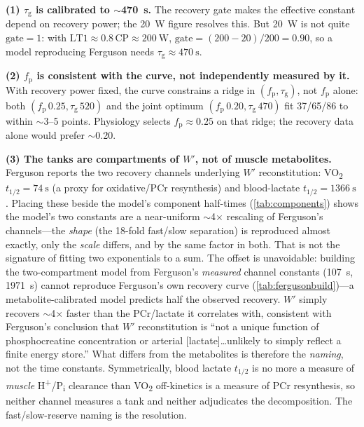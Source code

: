 \documentclass[11pt,a4paper]{article}
\newcommand{\Wp}{\ensuremath{W'}}
\newcommand{\CP}{\ensuremath{\mathrm{CP}}}
\newcommand{\LTone}{\ensuremath{\mathrm{LT1}}}
\newcommand{\fp}{\ensuremath{f_{\mathrm p}}}
\newcommand{\taug}{\ensuremath{\tau_{\mathrm g}}}
\newcommand{\halft}{\ensuremath{t_{1/2}}}
\begin{document}
\textbf{(1) \taug{} is calibrated to $\sim$470~s.} The recovery gate makes the effective constant depend on
recovery power; the 20~W figure resolves this. But 20~W is not quite $\mathrm{gate}=1$: with
$\LTone \approx 0.8\,\CP \approx 200~\mathrm{W}$, $\mathrm{gate} = (200-20)/200 = 0.90$, so a model
reproducing Ferguson needs $\taug \approx 470~\mathrm{s}$.

\textbf{(2) \fp{} is consistent with the curve, not independently measured by it.} With recovery power
fixed, the curve constrains a ridge in $(\fp,\taug)$, not \fp{} alone: both $(\fp\,0.25, \taug\,520)$ and
the joint optimum $(\fp\,0.20, \taug\,470)$ fit 37/65/86 to within $\sim$3--5 points. Physiology selects
$\fp \approx 0.25$ on that ridge; the recovery data alone would prefer $\sim$0.20.

\textbf{(3) The tanks are compartments of \Wp, not of muscle metabolites.} Ferguson reports the two
recovery channels underlying \Wp{} reconstitution: VO\textsubscript{2} $\halft = \SI{74}{\second}$ (a proxy
for oxidative/PCr resynthesis) and blood-lactate $\halft = \SI{1366}{\second}$. Placing these beside the
model's component half-times (\cref{tab:components}) shows the model's two constants are a near-uniform
$\sim$4$\times$ rescaling of Ferguson's channels---the \emph{shape} (the 18-fold fast/slow separation) is
reproduced almost exactly, only the \emph{scale} differs, and by the same factor in both. That is not the
signature of fitting two exponentials to a sum. The offset is unavoidable: building the two-compartment
model from Ferguson's \emph{measured} channel constants (107~s, 1971~s) cannot reproduce Ferguson's own
recovery curve (\cref{tab:fergusonbuild})---a metabolite-calibrated model predicts half the observed
recovery. \Wp{} simply recovers $\sim$4$\times$ faster than the PCr/lactate it correlates with, consistent
with Ferguson's conclusion that \Wp{} reconstitution is ``not a unique function of phosphocreatine
concentration or arterial [lactate]\dots unlikely to simply reflect a finite energy store.'' What differs
from the metabolites is therefore the \emph{naming}, not the time constants. Symmetrically, blood lactate
\halft{} is no more a measure of \emph{muscle} H\textsuperscript{+}/P\textsubscript{i} clearance than
VO\textsubscript{2} off-kinetics is a measure of PCr resynthesis, so neither channel measures a tank and
neither adjudicates the decomposition. The fast/slow-reserve naming is the resolution.
\end{document}
